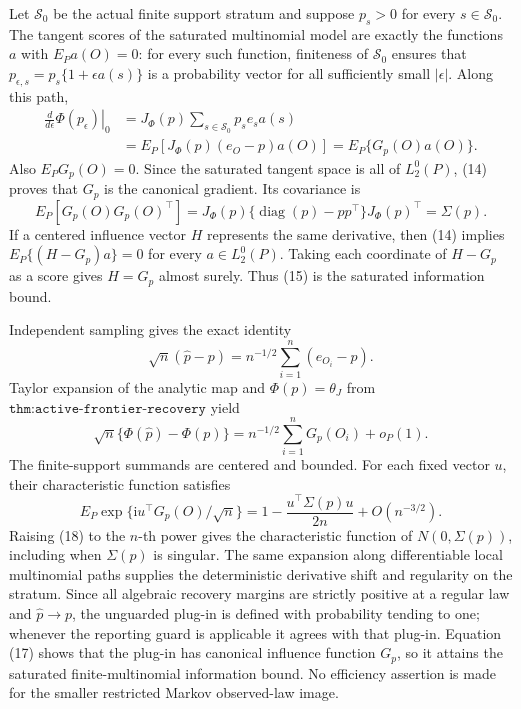 Let \(\mathcal S_0\) be the actual finite support stratum and suppose \(p_s>0\) for every \(s\in\mathcal S_0\).  The tangent scores of the saturated multinomial model are exactly the functions \(a\) with \(E_Pa(O)=0\): for every such function, finiteness of \(\mathcal S_0\) ensures that \(p_{\epsilon,s}=p_s\{1+\epsilon a(s)\}\) is a probability vector for all sufficiently small \(|\epsilon|\).  Along this path,
\[
\begin{aligned}
 \left.\frac{d}{d\epsilon}\Phi(p_\epsilon)\right|_0
 &=J_\Phi(p)\sum_{s\in\mathcal S_0}p_se_sa(s)\\
 &=E_P\!\left[J_\Phi(p)(e_O-p)a(O)\right]
 =E_P\{G_p(O)a(O)\}.
\end{aligned}
\tag{14}
\]
Also \(E_PG_p(O)=0\).  Since the saturated tangent space is all of \(L_2^0(P)\), (14) proves that \(G_p\) is the canonical gradient.  Its covariance is
\[
 E_P[G_p(O)G_p(O)^\top]
 =J_\Phi(p)\{\operatorname{diag}(p)-pp^\top\}J_\Phi(p)^\top
 =\Sigma(p).
\tag{15}
\]
If a centered influence vector \(H\) represents the same derivative, then (14) implies \(E_P\{(H-G_p)a\}=0\) for every \(a\in L_2^0(P)\).  Taking each coordinate of \(H-G_p\) as a score gives \(H=G_p\) almost surely.  Thus (15) is the saturated information bound.

Independent sampling gives the exact identity
\[
 \sqrt n(\widehat p-p)=n^{-1/2}\sum_{i=1}^n(e_{O_i}-p).
\tag{16}
\]
Taylor expansion of the analytic map and \(\Phi(p)=\theta_J\) from \(\texttt{thm:active-frontier-recovery}\) yield
\[
 \sqrt n\{\Phi(\widehat p)-\Phi(p)\}
 =n^{-1/2}\sum_{i=1}^nG_p(O_i)+o_P(1).
\tag{17}
\]
The finite-support summands are centered and bounded.  For each fixed vector \(u\), their characteristic function satisfies
\[
 E_P\exp\{\mathrm i u^\top G_p(O)/\sqrt n\}
 =1-\frac{u^\top\Sigma(p)u}{2n}+O(n^{-3/2}).
\tag{18}
\]
Raising (18) to the \(n\)-th power gives the characteristic function of \(N(0,\Sigma(p))\), including when \(\Sigma(p)\) is singular.  The same expansion along differentiable local multinomial paths supplies the deterministic derivative shift and regularity on the stratum.  Since all algebraic recovery margins are strictly positive at a regular law and \(\widehat p\to p\), the unguarded plug-in is defined with probability tending to one; whenever the reporting guard is applicable it agrees with that plug-in.  Equation (17) shows that the plug-in has canonical influence function \(G_p\), so it attains the saturated finite-multinomial information bound.  No efficiency assertion is made for the smaller restricted Markov observed-law image.

